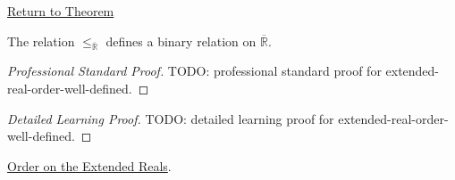 \newpage
{}
\label{prf:extended-real-order-well-defined}
\begin{remark*}[Return]
\hyperref[thm:extended-real-order-well-defined]{Return to Theorem}
\end{remark*}
\begin{theorem*}
The relation $\le_{\overline{\mathbb{R}}}$ defines a binary relation on
$\overline{\mathbb{R}}$.
\end{theorem*}
\begin{proof}[Professional Standard Proof]
\LRAProofBodyStart
TODO: professional standard proof for extended-real-order-well-defined.
\end{proof}
\begin{proof}[Detailed Learning Proof]
\LRAProofBodyStart
TODO: detailed learning proof for extended-real-order-well-defined.
\end{proof}
\begin{remark*}
\end{remark*}
\begin{dependencies}
\hyperref[def:extended-real-order]{Order on the Extended Reals}.
\end{dependencies}
\clearpage
